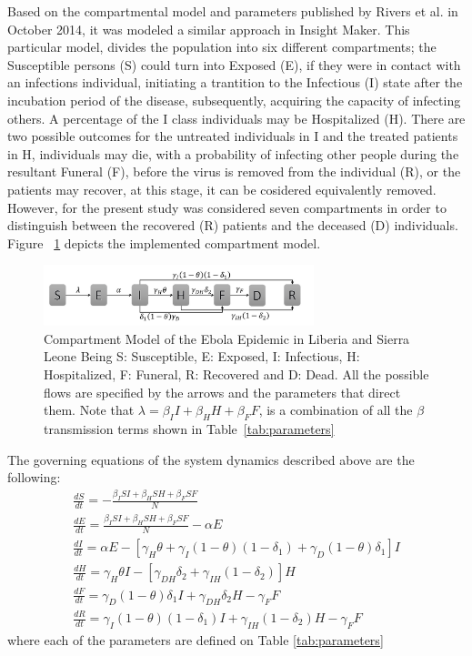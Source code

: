 Based on the compartmental model and parameters published by Rivers et al.\cite{Rivers2014} in October 2014, it was modeled a similar approach in Insight Maker.  This particular model, divides the population into six different compartments; the Susceptible persons (S) could turn into Exposed (E), if they were in contact with an infections individual, initiating a trantition to the Infectious (I) state after the incubation period of the disease, subsequently, acquiring the capacity of infecting others. A percentage of the I class individuals may be Hospitalized (H). There are two possible outcomes for the untreated individuals in I and the treated patients in H, individuals may die, with a probability of infecting other people during the resultant Funeral (F), before the virus is removed from the individual (R), or the patients may recover, at this stage, it can be cosidered equivalently removed. However, for the present study was considered seven compartments in order to distinguish between the recovered (R) patients and the deceased (D) individuals. 
Figure ~\ref{fig:compartment} depicts the implemented compartment model. \\



\begin{figure}[!h]
  \centering
  \includegraphics[width=0.7\textwidth]{compartment}
  \caption{Compartment Model of the Ebola Epidemic in Liberia and Sierra Leone \newline  Being S: Susceptible, E: Exposed, I: Infectious, H: Hospitalized, F: Funeral,  R: Recovered and D: Dead. All the possible flows are specified by the arrows and the parameters that direct them. Note that $\lambda = \beta_{I}I+\beta_{H}H+\beta_{F}F $, is a combination of all the $\beta$ transmission terms shown in Table~\ref{tab:parameters} } 
\label{fig:compartment} 
\end{figure}

 
The governing equations of the system dynamics described above are the following:
\begin{eqnarray} 
\label{SDeqn}
\frac{dS}{dt} = - \frac{\beta_{I}SI+\beta_{H}SH+\beta_{F}SF}{N}\\
\frac{dE}{dt} =  \frac{\beta_{I}SI+\beta_{H}SH+\beta_{F}SF}{N}-\alpha E\\
\frac{dI}{dt} =  \alpha E - [\gamma_{H}\theta + \gamma_{I}(1-\theta)(1-\delta_{1})+\gamma_{D}(1-\theta)\delta_{1}]I\\
\frac{dH}{dt} = \gamma_{H}\theta I - [\gamma_{DH}\delta_{2}+\gamma_{IH}(1-\delta_{2})]H\\
\frac{dF}{dt} = \gamma_{D}(1-\theta) \delta_{1} I + \gamma_{DH}\delta_{2} H-\gamma_{F} F\\
\frac{dR}{dt} = \gamma_{I}(1-\theta)(1- \delta_{1}) I + \gamma_{IH}(1-\delta_{2}) H-\gamma_{F} F
\end{eqnarray}
where each of the parameters are defined on Table \ref{tab:parameters}


